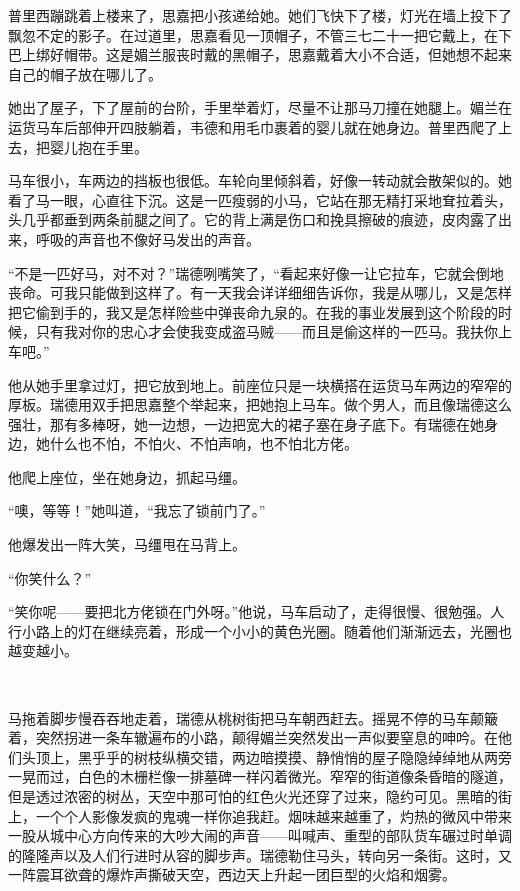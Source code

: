 \par 普里西蹦跳着上楼来了，思嘉把小孩递给她。她们飞快下了楼，灯光在墙上投下了飘忽不定的影子。在过道里，思嘉看见一顶帽子，不管三七二十一把它戴上，在下巴上绑好帽带。这是媚兰服丧时戴的黑帽子，思嘉戴着大小不合适，但她想不起来自己的帽子放在哪儿了。
\par 她出了屋子，下了屋前的台阶，手里举着灯，尽量不让那马刀撞在她腿上。媚兰在运货马车后部伸开四肢躺着，韦德和用毛巾裹着的婴儿就在她身边。普里西爬了上去，把婴儿抱在手里。
\par 马车很小，车两边的挡板也很低。车轮向里倾斜着，好像一转动就会散架似的。她看了马一眼，心直往下沉。这是一匹瘦弱的小马，它站在那无精打采地耷拉着头，头几乎都垂到两条前腿之间了。它的背上满是伤口和挽具擦破的痕迹，皮肉露了出来，呼吸的声音也不像好马发出的声音。
\par “不是一匹好马，对不对？”瑞德咧嘴笑了，“看起来好像一让它拉车，它就会倒地丧命。可我只能做到这样了。有一天我会详详细细告诉你，我是从哪儿，又是怎样把它偷到手的，我又是怎样险些中弹丧命九泉的。在我的事业发展到这个阶段的时候，只有我对你的忠心才会使我变成盗马贼——而且是偷这样的一匹马。我扶你上车吧。”
\par 他从她手里拿过灯，把它放到地上。前座位只是一块横搭在运货马车两边的窄窄的厚板。瑞德用双手把思嘉整个举起来，把她抱上马车。做个男人，而且像瑞德这么强壮，那有多棒呀，她一边想，一边把宽大的裙子塞在身子底下。有瑞德在她身边，她什么也不怕，不怕火、不怕声响，也不怕北方佬。
\par 他爬上座位，坐在她身边，抓起马缰。
\par “噢，等等！”她叫道，“我忘了锁前门了。”
\par 他爆发出一阵大笑，马缰甩在马背上。
\par “你笑什么？”
\par “笑你呢——要把北方佬锁在门外呀。”他说，马车启动了，走得很慢、很勉强。人行小路上的灯在继续亮着，形成一个小小的黄色光圈。随着他们渐渐远去，光圈也越变越小。
\par  
\par 马拖着脚步慢吞吞地走着，瑞德从桃树街把马车朝西赶去。摇晃不停的马车颠簸着，突然拐进一条车辙遍布的小路，颠得媚兰突然发出一声似要窒息的呻吟。在他们头顶上，黑乎乎的树枝纵横交错，两边暗摸摸、静悄悄的屋子隐隐绰绰地从两旁一晃而过，白色的木栅栏像一排墓碑一样闪着微光。窄窄的街道像条昏暗的隧道，但是透过浓密的树丛，天空中那可怕的红色火光还穿了过来，隐约可见。黑暗的街上，一个个人影像发疯的鬼魂一样你追我赶。烟味越来越重了，灼热的微风中带来一股从城中心方向传来的大吵大闹的声音——叫喊声、重型的部队货车碾过时单调的隆隆声以及人们行进时从容的脚步声。瑞德勒住马头，转向另一条街。这时，又一阵震耳欲聋的爆炸声撕破天空，西边天上升起一团巨型的火焰和烟雾。
